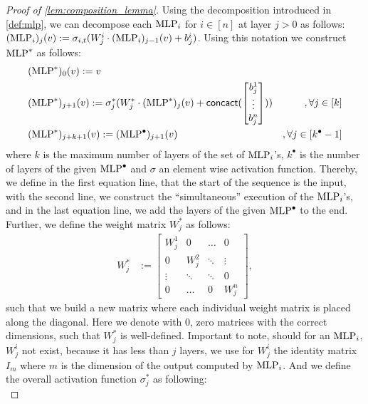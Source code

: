 \begin{proof}[Proof of \cref{lem:composition_lemma}]
    Using the decomposition introduced in \cref{def:mlp}, we can decompose each $\text{MLP}_i$ for $i \in [n]$ at layer $j > 0$ as follows: $(\text{MLP}_i)_{j}(v) := \sigma_{i,t}(W^{i}_{j} \cdot (\text{MLP}_i)_{j-1}(v) + b^i_j)$. Using this notation we construct $\text{MLP}^*$ as follows:
    \begin{align*}
        &(\text{MLP}^*)_{0}(v) := v\\
        &(\text{MLP}^*)_{j+1}(v) := \sigma^*_j(W^*_j \cdot (\text{MLP}^*)_{j} (v) + \textsf{concact}(
            \begin{bmatrix}
                b^1_j\\
                \vdots\\
                b^n_j
            \end{bmatrix})) &,\forall j \in [k]\\
        &(\text{MLP}^*)_{j+k+1}(v) := (\text{MLP}^\bullet)_{j+1}(v) &,\forall j \in [k^\bullet - 1]
    \end{align*}
    where $k$ is the maximum number of layers of the set of $\text{MLP}_i$'s, $k^\bullet$ is the number of layers of the given $\text{MLP}^\bullet$ and $\sigma$ an element wise activation function. Thereby, we define in the first equation line, that the start of the sequence is the input, with the second line, we construct the ``simultaneous'' execution of the $\text{MLP}_i$'s, and in the last equation line, we add the layers of the given $\text{MLP}^\bullet$ to the end. Further, we define the weight matrix $W_j^*$ as follows: 
    \begin{align*}
        W^*_j &:= \begin{bmatrix}
            W^1_j & 0 & \hdots & 0\\
            0 & W^2_j & \ddots & \vdots\\
            \vdots & \ddots & \ddots & 0\\
            0 & \hdots & 0 & W^n_j
        \end{bmatrix},
    \end{align*}
    such that we build a new matrix where each individual weight matrix is placed along the diagonal. Here we denote with $0$, zero matrices with the correct dimensions, such that $W_j^*$ is well-defined. Important to note, should for an $\text{MLP}_i$, $W^i_j$ not exist, because it has less than $j$ layers, we use for $W^i_j$ the identity matrix $I_m$ where $m$ is the dimension of the output computed by $\text{MLP}_i$. And we define the overall activation function $\sigma^*_j$ as following:
    \begin{equation*}

\end{equation*}
\end{proof}
